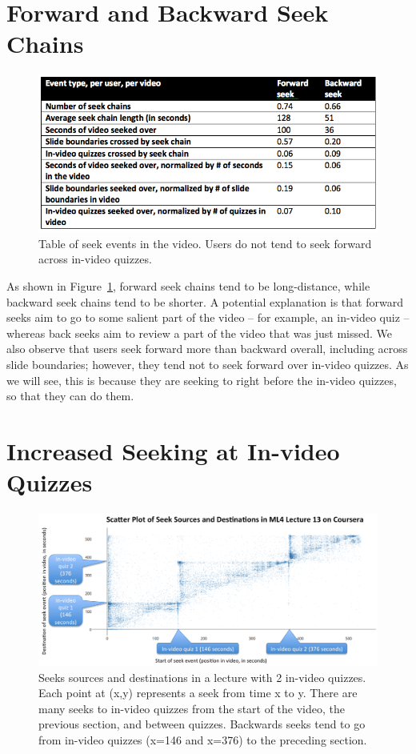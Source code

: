 \documentclass[letterpaper]{article}
\begin{document}
\section{Forward and Backward Seek Chains}

\begin{figure}
\includegraphics[width=1.0\columnwidth]{table-of-seeks}
\caption{Table of seek events in the video. Users do not tend to seek forward across in-video quizzes.}
\label{fig:table-of-seeks}
\end{figure}

As shown in Figure~\ref{fig:table-of-seeks}, forward seek chains tend to be long-distance, while backward seek chains tend to be shorter. A potential explanation is that forward seeks aim to go to some salient part of the video -- for example, an in-video quiz -- whereas back seeks aim to review a part of the video that was just missed. We also observe that users seek forward more than backward overall, including across slide boundaries; however, they tend not to seek forward over in-video quizzes. As we will see, this is because they are seeking to right before the in-video quizzes, so that they can do them.

\section{Increased Seeking at In-video Quizzes}

\begin{figure}
\includegraphics[width=1.0\columnwidth]{scatter-plot-of-seeks}
\caption{Seeks sources and destinations in a lecture with 2 in-video quizzes. Each point at (x,y) represents a seek from time x to y. There are many seeks to in-video quizzes from the start of the video, the previous section, and between quizzes. Backwards seeks tend to go from in-video quizzes (x=146 and x=376) to the preceding section.}
\label{fig:scatter-plot-of-seeks}
\end{figure}
\end{document}
